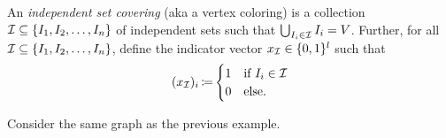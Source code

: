 \begin{defn}
    \label{def:ind-set-covering}
    An \textit{independent set covering} (aka a vertex coloring) is a collection $\mathcal{I} \subseteq\{I_1, I_2, \dots, I_n\}$ of independent sets such that $\bigcup_{I_i \in \mathcal{I}} I_i = V$. Further, for all $\mathcal{I} \subseteq \{I_1, I_2, \dots, I_n\}$, define the indicator vector $x_{\mathcal{I}} \in \{0,1\}^l$ such that
    \[
        (x_{\mathcal{I}})_i \operatorname*{\coloneqq} \begin{cases}
                                1 & \text{if } I_i \in \mathcal{I} \\
                                0 & \text{else}.
                               \end{cases}
    \]
\end{defn}

\begin{exm}
    Consider the same graph as the previous example.
    \begin{center}
    \end{center}
    

\end{exm}
